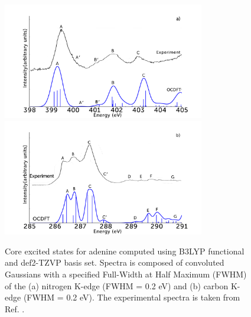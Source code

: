 \documentclass[12pt]{article}
\begin{document}
 \begin{figure}[!t]
\centering
\includegraphics[width=8.8cm]{AdenineNKexperiment.png} \\
\includegraphics[width=8.8cm]{AdenineCKexperiment.png}
\caption{Core excited states for adenine computed using B3LYP functional and def2-TZVP basis set. Spectra is composed of convoluted Gaussians with a specified Full-Width at Half Maximum (FWHM) of the (a) nitrogen K-edge (FWHM = 0.2 eV) and (b) carbon K-edge (FWHM = 0.2 eV). The experimental spectra is taken from Ref. .}
\label{figure:Adenine}
\end{figure} 
\end{document}
